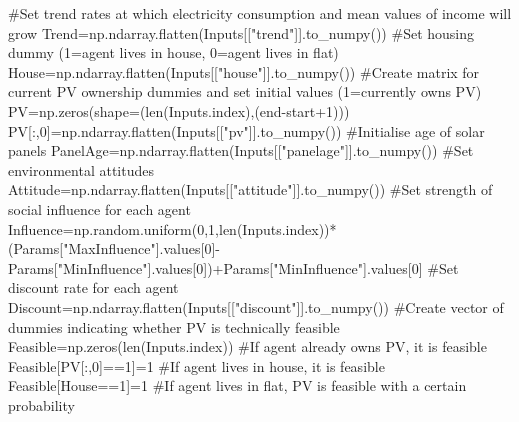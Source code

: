 \documentclass[
  letterpaper,
  DIV=11,
  numbers=noendperiod]{scrartcl}
\newenvironment{Shaded}{\begin{snugshade}}{\end{snugshade}}
\newcommand{\BuiltInTok}[1]{\textcolor[rgb]{0.00,0.23,0.31}{#1}}
\newcommand{\CommentTok}[1]{\textcolor[rgb]{0.37,0.37,0.37}{#1}}
\newcommand{\DecValTok}[1]{\textcolor[rgb]{0.68,0.00,0.00}{#1}}
\newcommand{\NormalTok}[1]{\textcolor[rgb]{0.00,0.23,0.31}{#1}}
\newcommand{\OperatorTok}[1]{\textcolor[rgb]{0.37,0.37,0.37}{#1}}
\newcommand{\StringTok}[1]{\textcolor[rgb]{0.13,0.47,0.30}{#1}}
\begin{document}
\begin{Shaded}
\begin{Highlighting}[]
    \CommentTok{\#Set trend rates at which electricity consumption and mean values of income will grow}
\NormalTok{    Trend}\OperatorTok{=}\NormalTok{np.ndarray.flatten(Inputs[[}\StringTok{"trend"}\NormalTok{]].to\_numpy())}
    \CommentTok{\#Set housing dummy (1=agent lives in house, 0=agent lives in flat)}
\NormalTok{    House}\OperatorTok{=}\NormalTok{np.ndarray.flatten(Inputs[[}\StringTok{"house"}\NormalTok{]].to\_numpy())}
    \CommentTok{\#Create matrix for current PV ownership dummies and set initial values (1=currently owns PV)}
\NormalTok{    PV}\OperatorTok{=}\NormalTok{np.zeros(shape}\OperatorTok{=}\NormalTok{(}\BuiltInTok{len}\NormalTok{(Inputs.index),(end}\OperatorTok{{-}}\NormalTok{start}\OperatorTok{+}\DecValTok{1}\NormalTok{)))}
\NormalTok{    PV[:,}\DecValTok{0}\NormalTok{]}\OperatorTok{=}\NormalTok{np.ndarray.flatten(Inputs[[}\StringTok{"pv"}\NormalTok{]].to\_numpy())}
    \CommentTok{\#Initialise age of solar panels}
\NormalTok{    PanelAge}\OperatorTok{=}\NormalTok{np.ndarray.flatten(Inputs[[}\StringTok{"panelage"}\NormalTok{]].to\_numpy())}
    \CommentTok{\#Set environmental attitudes}
\NormalTok{    Attitude}\OperatorTok{=}\NormalTok{np.ndarray.flatten(Inputs[[}\StringTok{"attitude"}\NormalTok{]].to\_numpy())}
    \CommentTok{\#Set strength of social influence for each agent}
\NormalTok{    Influence}\OperatorTok{=}\NormalTok{np.random.uniform(}\DecValTok{0}\NormalTok{,}\DecValTok{1}\NormalTok{,}\BuiltInTok{len}\NormalTok{(Inputs.index))}\OperatorTok{*}\NormalTok{(Params[}\StringTok{"MaxInfluence"}\NormalTok{].values[}\DecValTok{0}\NormalTok{]}\OperatorTok{{-}}\NormalTok{Params[}\StringTok{"MinInfluence"}\NormalTok{].values[}\DecValTok{0}\NormalTok{])}\OperatorTok{+}\NormalTok{Params[}\StringTok{"MinInfluence"}\NormalTok{].values[}\DecValTok{0}\NormalTok{]}
    \CommentTok{\#Set discount rate for each agent}
\NormalTok{    Discount}\OperatorTok{=}\NormalTok{np.ndarray.flatten(Inputs[[}\StringTok{"discount"}\NormalTok{]].to\_numpy())}
    \CommentTok{\#Create vector of dummies indicating whether PV is technically feasible}
\NormalTok{    Feasible}\OperatorTok{=}\NormalTok{np.zeros(}\BuiltInTok{len}\NormalTok{(Inputs.index))}
    \CommentTok{\#If agent already owns PV, it is feasible}
\NormalTok{    Feasible[PV[:,}\DecValTok{0}\NormalTok{]}\OperatorTok{==}\DecValTok{1}\NormalTok{]}\OperatorTok{=}\DecValTok{1}
    \CommentTok{\#If agent lives in house, it is feasible}
\NormalTok{    Feasible[House}\OperatorTok{==}\DecValTok{1}\NormalTok{]}\OperatorTok{=}\DecValTok{1}
    \CommentTok{\#If agent lives in flat, PV is feasible with a certain probability}

\end{Highlighting}
\end{Shaded}
\end{document}
